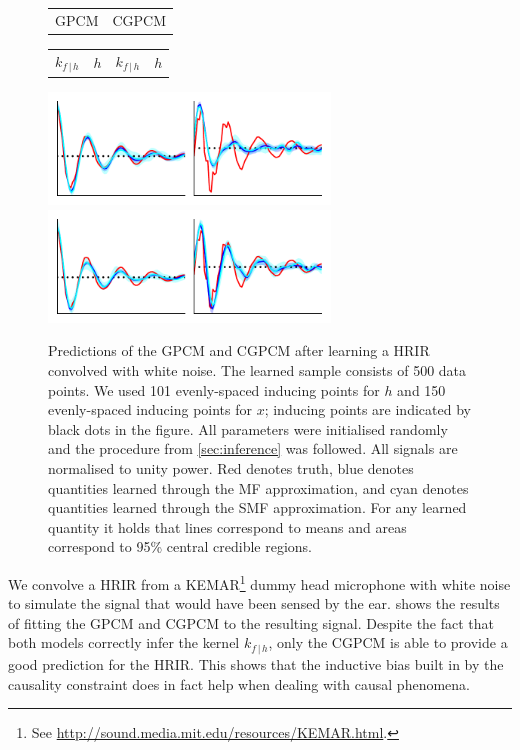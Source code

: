 \documentclass{article}
\newcommand{\cond}{\, | \,}               %
\begin{document}
\begin{figure}[t]
    \centering
    \begin{tabularx}{\linewidth}{>{\centering}X>{\centering}X}
        GPCM & CGPCM
    \end{tabularx}
    \begin{tabularx}{\linewidth}{>{\centering}X>{\centering}X>{\centering}X>{\centering}X}
        $k_{f\cond h}$ & $h$ & $k_{f\cond h}$ & $h$
    \end{tabularx}
    \includegraphics[width=.49\linewidth, height=3cm]{resources/hrtf_gpcm.pdf}
    \includegraphics[width=.49\linewidth, height=3cm]{resources/hrtf_cgpcm.pdf}
    \caption{Predictions of the GPCM and CGPCM after learning a HRIR convolved with white noise. The learned sample consists of 500 data points. We used 101 evenly-spaced inducing points for $h$ and 150 evenly-spaced inducing points for $x$; inducing points are indicated by black dots in the figure. All parameters were initialised randomly and the procedure from \cref{sec:inference} was followed. All signals are normalised to unity power. {\color{red}Red} denotes truth, {\color{blue}blue} denotes quantities learned through the MF approximation, and {\color{mycyan}cyan} denotes quantities learned through the SMF approximation. For any learned quantity it holds that lines correspond to means and areas correspond to 95\% central credible regions.}
    \label{fig:hrir}
\end{figure}

We convolve a HRIR from a KEMAR\footnote{See \url{http://sound.media.mit.edu/resources/KEMAR.html}.} dummy head microphone with white noise to simulate the signal that would have been sensed by the ear.  shows the results of fitting the GPCM and CGPCM to the resulting signal. Despite the fact that both models correctly infer the kernel $k_{f \cond h}$, only the CGPCM is able to provide a good prediction for the HRIR. This shows that the inductive bias built in by the causality constraint does in fact help when dealing with causal phenomena.
\end{document}
